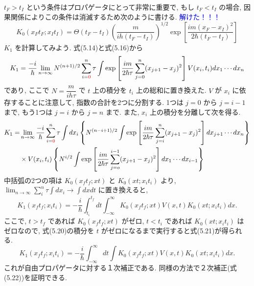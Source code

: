 \documentclass[a4paper,12pt]{article}
\begin{document}
$t_{F} > t_{I}$ という条件はプロパゲータにとって非常に重要で, もし $t_{F} < t_{I}$ の場合, 因果関係によりこの条件は消滅するため次のように書ける. \textcolor{blue}{解けた！！！}
\begin{equation*}
    K_{0}(x_{F}t_{F}; x_{I}t_{I}) = \Theta(t_{F} - t_{I})\left( \frac{m}{ih(t_{F} - t_{I})} \right)^{1/2} \exp\left[ \frac{im(x_{F} - x_{I})^2}{2\hbar(t_{F} - t_{I})} \right] \tag{5.19}
\end{equation*}
$K_{1}$ を計算してみよう. 式(5.14)と式(5.16)から
\begin{equation*}
    K_{1} = \frac{-i}{\hbar}\lim_{n \rightarrow \infty} N^{(n+1)/2}\sum_{i=\textcolor{red}{0}}^{n}\tau\int\exp\left[ \frac{im}{2\hbar\tau}\sum_{j=0}^{n}(x_{j+1} - x_{j})^2 \right] V(x_{i}, t_{i}) dx_1 \cdots dx_{n}
\end{equation*}
であり, ここで $N = \dfrac{m}{ih\tau}$ で $t$ 上の積分を $t_{i}$ 上の総和に置き換えた. $V$ が $x_{i}$ に依存することに注意して, 指数の合計を2つに分割する. 1つは $j=0$ から $j=i-1$ まで, もう1つは $j=i$ から $j=n$ まで. また, $x_{i}$ 上の積分を分離して次を得る.
\begin{align*}
    K_1 = &\lim_{n\rightarrow\infty}\frac{-i}{\hbar}\sum_{i=\textcolor{red}{0}}^{n}\tau\int dx_{i} \left\{ N^{(n-i+1)/2}\int\exp\left[ \frac{im}{2\hbar\tau}\sum_{j=i}^{n}(x_{j+1} - x_{j})^2 \right]dx_{j+1}\cdots dx_{n} \right\}\\
    &\times V(x_{i}, t_{i})\left\{ N^{i/2}\int\exp \left[ \frac{im}{2\hbar\tau}\sum_{j=o}^{i-1}(x_{j+1} - x_{j})^2 \right] dx_1 \cdots dx_{i-1} \right\} 
\end{align*}
中括弧の2つの項は $K_{0}(x_{f}t_{f}; xt)$ と $K_{0}(xt; x_{i}t_{i})$ より, $\displaystyle \lim_{n \to \infty} \sum_{i}^{n}\tau\int dx_{i} \to \int dx dt$ に置き換えると,
\begin{equation*}
    K_{1}(x_{f}t_{f}; x_{i}t_{i}) = -\frac{i}{\hbar}\int_{t_i}^{t_f}dt\int_{-\infty}^{\infty} K_{0}(x_{f}t_{f}; xt)V(x, t)K_{0}(xt; x_{i}t_{i})dx. \tag{5.20}
\end{equation*}
ここで, $t > t_f$ であれば $K_{0}(x_{f}t_{f}; xt)$ がゼロ, $t < t_i$ であれば $K_{0}(xt; x_{i}t_{i})$ はゼロなので, 式(5.20)の積分を $t$ がゼロになるまで実行すると式(5.21)が得られる.
\begin{equation*}
    K_{1}(x_{f}t_{f}; x_{i}t_{i}) = -\frac{i}{\hbar}\int_{-\infty}^{\infty}dt\int K_{0}(x_{f}t_{f}; xt)V(x, t)K_{0}(xt; x_{i}t_{i})dx. \tag{5.21}
\end{equation*}
これが自由プロパゲータに対する１次補正である. 同様の方法で２次補正(式(5.22))を証明できる.
\end{document}
